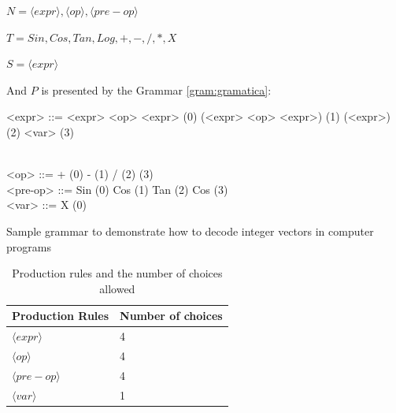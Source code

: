 \documentclass[conference]{IEEEtran}
\begin{document}
\begin{center}
	
	$ N = {\langle expr \rangle, \langle op \rangle, \langle pre-op \rangle}$
	
	$ T = {Sin,Cos,Tan,Log,+,-,/,*,X} $
	
	$ S = \langle expr \rangle $
	
\end{center}

\noindent
And $P$ is presented by the Grammar \ref{gram:gramatica}:

\begin{Grammar}
	\begin{grammar}
		
		
		<expr> ::=  <expr> <op> <expr> \hspace{2cm} (0) 
		\alt (<expr> <op> <expr>)  \hspace{1.75cm}  (1)  
		\alt <pre-op> (<expr>) \hspace{2.2cm}  (2)  \hspace{3.9cm} (3) \\\
		
		<op> ::=  + \hspace{4.4cm} (0)   \alt - \hspace{4.5cm}  (1)  \alt  /  \hspace{4.51cm}  (2) \alt * \hspace{4.45cm}  (3) \\
		
		<pre-op> ::= Sin \hspace{4.2cm} (0) \alt Cos
	\hspace{4.12cm} (1) \alt Tan  \hspace{4.13cm} (2) \alt Cos \hspace{4.12cm} (3) \\
		
		<var> ::= X  \hspace{4.4cm} (0)
		
		
	\end{grammar}
	
	\caption{Sample grammar to demonstrate how to decode integer vectors in computer programs}
	\label{gram:gramatica}
\end{Grammar}


\begin{table}[htb]
	\centering
	\caption{Production rules and the number of choices allowed}
	\label{tab:productionRules}
	\begin{tabular}{|l|l|}
		\hline
		Production Rules & Number of choices \\ \hline
		$\langle expr \rangle$                        & 4       \\ \hline
		$\langle op \rangle$                         & 4       \\ \hline
		$\langle pre-op \rangle$                         & 4       \\ \hline
		$\langle var \rangle$                          & 1       \\ \hline
	\end{tabular}
\end{table}
\end{document}

